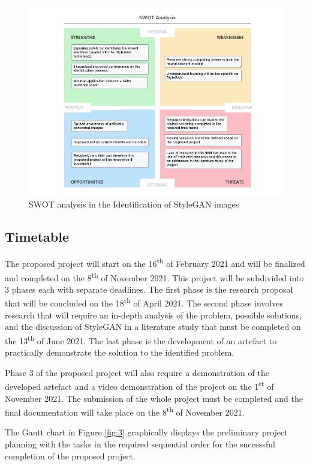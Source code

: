 \begin{figure}[H]%
\centering
\includegraphics[width=1\textwidth]{img/SWOT.png}
\caption{SWOT analysis in the Identification of StyleGAN images}%
\label{fig:2}%
\end{figure}

\subsection{Timetable}

The proposed project will start on the 16\textsuperscript{th} of February 2021 and will be finalized and completed on the 8\textsuperscript{th} of November 2021. This project will be subdivided into 3 phases each with separate deadlines. The first phase is the research proposal that will be concluded on the 18\textsuperscript{th} of April 2021. The second phase involves research that will require an in-depth analysis of the problem, possible solutions, and the discussion of StyleGAN in a literature study that must be completed on the 13\textsuperscript{th} of June 2021. The last phase is the development of an artefact to practically demonstrate the solution to the identified problem. 

Phase 3 of the proposed project will also require a demonstration of the developed artefact and a video demonstration of the project on the 1\textsuperscript{st} of November 2021. The submission of the whole project must be completed and the final documentation will take place on the 8\textsuperscript{th} of November 2021. 

The Gantt chart in Figure \ref{fig:3} graphically displays the preliminary project planning with the tasks in the required sequential order for the successful completion of the proposed project. 

